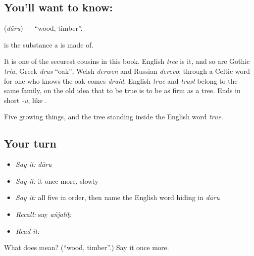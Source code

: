 \subsection*{You'll want to know: }
\textbf{} (\emph{dāru}) — \textquotedblleft{}wood, timber\textquotedblright{}.

\textbf{} is the substance a \textbf{} is made of.

It is one of the securest cousins in this book. English \emph{tree} is it, and so are Gothic \emph{triu}, Greek \emph{drus} \textquotedblleft{}oak\textquotedblright{}, Welsh \emph{derwen} and Russian \emph{derevo}; through a Celtic word for one who knows the oak comes \emph{druid}. English \emph{true} and \emph{trust} belong to the same family, on the old idea that to be true is to be as firm as a tree. Ends in short \emph{-u}, like \textbf{}.

\begin{grammarlens}[title={What you've built}]
Five growing things, and the tree standing inside the English word \emph{true}.
\end{grammarlens}

\subsection*{Your turn}
\begin{itemize}
\raggedright
  \item \emph{Say it:} \emph{dāru}
  \item \emph{Say it:} it once more, slowly
  \item \emph{Say it:} all five in order, then name the English word hiding in \emph{dāru}
  \item \emph{Recall:} say \emph{añjaliḥ}
  \item \emph{Read it:} \textbf{}
\end{itemize}

\begin{tcolorbox}[breakable,colback=teal!4,colframe=teal!35!black,title={Before you move on}]
What does  mean? (\textquotedblleft{}wood, timber\textquotedblright{}.) Say it once more.
\end{tcolorbox}
